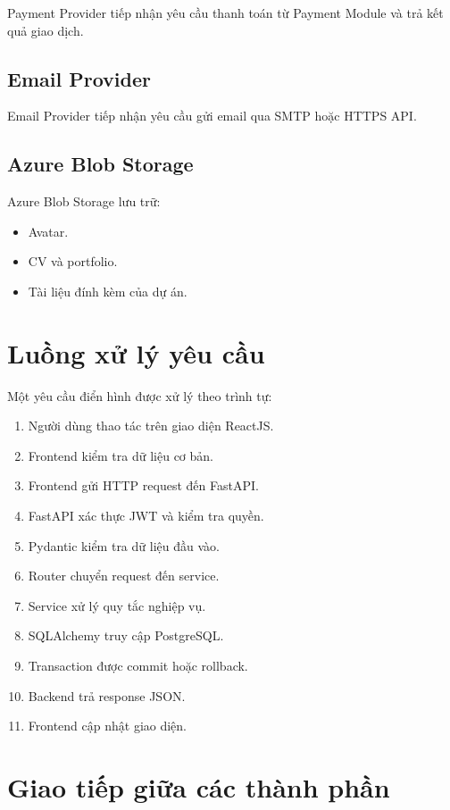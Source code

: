 Payment Provider tiếp nhận yêu cầu thanh toán từ Payment Module và trả kết quả giao dịch.

\subsection{Email Provider}

Email Provider tiếp nhận yêu cầu gửi email qua SMTP hoặc HTTPS API.

\subsection{Azure Blob Storage}

Azure Blob Storage lưu trữ:

\begin{itemize}
    \item Avatar.
    \item CV và portfolio.
    \item Tài liệu đính kèm của dự án.
\end{itemize}

\section{Luồng xử lý yêu cầu}
\label{sec:request-flow}

Một yêu cầu điển hình được xử lý theo trình tự:

\begin{enumerate}
    \item Người dùng thao tác trên giao diện ReactJS.
    \item Frontend kiểm tra dữ liệu cơ bản.
    \item Frontend gửi HTTP request đến FastAPI.
    \item FastAPI xác thực JWT và kiểm tra quyền.
    \item Pydantic kiểm tra dữ liệu đầu vào.
    \item Router chuyển request đến service.
    \item Service xử lý quy tắc nghiệp vụ.
    \item SQLAlchemy truy cập PostgreSQL.
    \item Transaction được commit hoặc rollback.
    \item Backend trả response JSON.
    \item Frontend cập nhật giao diện.
\end{enumerate}

\section{Giao tiếp giữa các thành phần}
\label{sec:component-communication}

